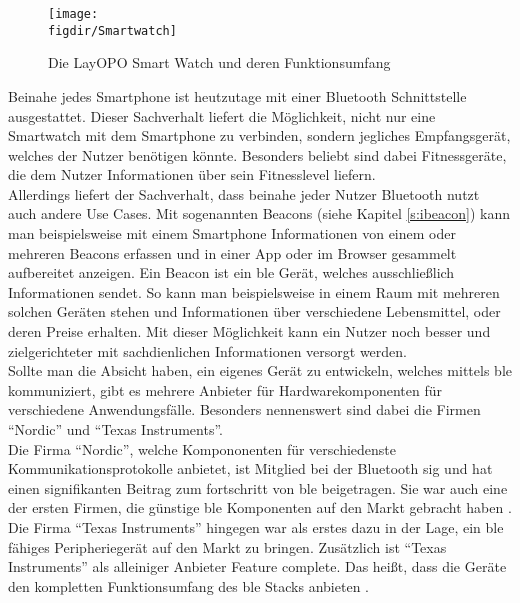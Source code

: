 \begin{figure}[h]
	\centering
	\texttt{[image: \\figdir/Smartwatch]}
	\caption{Die LayOPO Smart Watch und deren Funktionsumfang \cite{WTC:WWW}}
	\label{FIG:smartwatch}
\end{figure}

\noindent Beinahe jedes Smartphone ist heutzutage mit einer Bluetooth Schnittstelle ausgestattet. Dieser Sachverhalt liefert die Möglichkeit, nicht nur eine Smartwatch mit dem Smartphone zu verbinden, sondern jegliches Empfangsgerät, welches der Nutzer benötigen könnte. Besonders beliebt sind dabei Fitnessgeräte, die dem Nutzer Informationen über sein Fitnesslevel liefern.\\

\noindent Allerdings liefert der Sachverhalt, dass beinahe jeder Nutzer Bluetooth nutzt auch andere Use Cases. Mit sogenannten Beacons (siehe Kapitel \ref{s:ibeacon}) kann man beispielsweise mit einem Smartphone Informationen von einem oder mehreren Beacons erfassen und in einer App oder im Browser gesammelt aufbereitet anzeigen. Ein Beacon ist ein \ac{ble} Gerät, welches ausschließlich Informationen sendet. So kann man beispielsweise in einem Raum mit mehreren solchen Geräten stehen und Informationen über verschiedene Lebensmittel, oder deren Preise erhalten. Mit dieser Möglichkeit kann ein Nutzer noch besser und zielgerichteter mit sachdienlichen Informationen versorgt werden.\\

\noindent Sollte man die Absicht haben, ein eigenes Gerät zu entwickeln, welches mittels \ac{ble} kommuniziert, gibt es mehrere Anbieter für Hardwarekomponenten für verschiedene Anwendungsfälle. Besonders nennenswert sind dabei die Firmen "`Nordic"' und "`Texas Instruments"'.\\

\noindent Die Firma "`Nordic"', welche Kompononenten für verschiedenste Kommunikationsprotokolle anbietet, ist Mitglied bei der Bluetooth \ac{sig} und hat einen signifikanten Beitrag zum fortschritt von \ac{ble} beigetragen. Sie war auch eine der ersten Firmen, die günstige \ac{ble} Komponenten auf den Markt gebracht haben \cite[Seite 75]{Townsend14:GSB}.\\

\noindent Die Firma "`Texas Instruments"' hingegen war als erstes dazu in der Lage, ein \ac{ble} fähiges Peripheriegerät auf den Markt zu bringen. Zusätzlich ist "`Texas Instruments"' als alleiniger Anbieter Feature complete. Das heißt, dass die Geräte den kompletten Funktionsumfang des \ac{ble} Stacks anbieten \cite[Seite 79]{Townsend14:GSB}.\\ 

